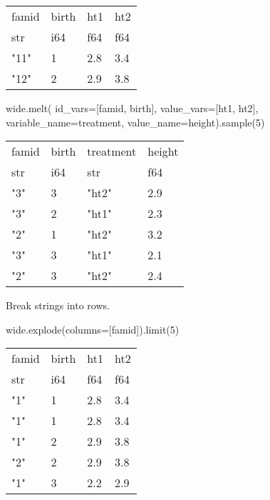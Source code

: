 \documentclass[
  letterpaper,
  DIV=11,
  numbers=noendperiod]{scrartcl}
\newenvironment{Shaded}{\begin{snugshade}}{\end{snugshade}}
\newcommand{\DecValTok}[1]{\textcolor[rgb]{0.68,0.00,0.00}{#1}}
\newcommand{\NormalTok}[1]{\textcolor[rgb]{0.00,0.23,0.31}{#1}}
\newcommand{\OperatorTok}[1]{\textcolor[rgb]{0.37,0.37,0.37}{#1}}
\newcommand{\StringTok}[1]{\textcolor[rgb]{0.13,0.47,0.30}{#1}}
\begin{document}
\begin{longtable}[]{@{}llll@{}}
\toprule()
famid & birth & ht1 & ht2 \\
str & i64 & f64 & f64 \\
\midrule()
\endhead
"11" & 1 & 2.8 & 3.4 \\
"12" & 2 & 2.9 & 3.8 \\
\bottomrule()
\end{longtable}

\begin{Shaded}
\begin{Highlighting}[]
\NormalTok{wide.melt(}
\NormalTok{  id\_vars}\OperatorTok{=}\NormalTok{[}\StringTok{\textquotesingle{}famid\textquotesingle{}}\NormalTok{, }\StringTok{\textquotesingle{}birth\textquotesingle{}}\NormalTok{], }
\NormalTok{  value\_vars}\OperatorTok{=}\NormalTok{[}\StringTok{\textquotesingle{}ht1\textquotesingle{}}\NormalTok{, }\StringTok{\textquotesingle{}ht2\textquotesingle{}}\NormalTok{], }
\NormalTok{  variable\_name}\OperatorTok{=}\StringTok{\textquotesingle{}treatment\textquotesingle{}}\NormalTok{, }
\NormalTok{  value\_name}\OperatorTok{=}\StringTok{\textquotesingle{}height\textquotesingle{}}\NormalTok{).sample(}\DecValTok{5}\NormalTok{)}
\end{Highlighting}
\end{Shaded}

\begin{longtable}[]{@{}llll@{}}
\toprule()
famid & birth & treatment & height \\
str & i64 & str & f64 \\
\midrule()
\endhead
"3" & 3 & "ht2" & 2.9 \\
"3" & 2 & "ht1" & 2.3 \\
"2" & 1 & "ht2" & 3.2 \\
"3" & 3 & "ht1" & 2.1 \\
"2" & 3 & "ht2" & 2.4 \\
\bottomrule()
\end{longtable}

Break strings into rows.

\begin{Shaded}
\begin{Highlighting}[]
\NormalTok{wide.explode(columns}\OperatorTok{=}\NormalTok{[}\StringTok{\textquotesingle{}famid\textquotesingle{}}\NormalTok{]).limit(}\DecValTok{5}\NormalTok{)}
\end{Highlighting}
\end{Shaded}

\begin{longtable}[]{@{}llll@{}}
\toprule()
famid & birth & ht1 & ht2 \\
str & i64 & f64 & f64 \\
\midrule()
\endhead
"1" & 1 & 2.8 & 3.4 \\
"1" & 1 & 2.8 & 3.4 \\
"1" & 2 & 2.9 & 3.8 \\
"2" & 2 & 2.9 & 3.8 \\
"1" & 3 & 2.2 & 2.9 \\
\bottomrule()
\end{longtable}
\end{document}
